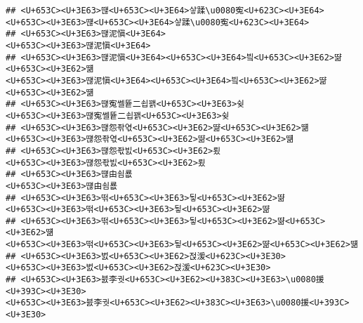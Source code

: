 \documentclass[]{article}
\begin{document}
\begin{verbatim}
## <U+653C><U+3E63>떊<U+653C><U+3E64>샇蹂\u0080寃<U+623C><U+3E64>                                                                                                                                     <U+653C><U+3E63>떊<U+653C><U+3E64>샇蹂\u0080寃<U+623C><U+3E64>
## <U+653C><U+3E63>떊泥愼<U+3E64>                                                                                                                                                                                   <U+653C><U+3E63>떊泥愼<U+3E64>
## <U+653C><U+3E63>떊泥愼<U+3E64><U+653C><U+3E64>빀<U+653C><U+3E62>땲<U+653C><U+3E62>떎                                                                                                           <U+653C><U+3E63>떊泥愼<U+3E64><U+653C><U+3E64>빀<U+653C><U+3E62>땲<U+653C><U+3E62>떎
## <U+653C><U+3E63>떊寃쎌뜥二쇱꽭<U+653C><U+3E63>슂                                                                                                                                                     <U+653C><U+3E63>떊寃쎌뜥二쇱꽭<U+653C><U+3E63>슂
## <U+653C><U+3E63>떊怨좎엯<U+653C><U+3E62>땲<U+653C><U+3E62>떎                                                                                                                                         <U+653C><U+3E63>떊怨좎엯<U+653C><U+3E62>땲<U+653C><U+3E62>떎
## <U+653C><U+3E63>떊怨좏빐<U+653C><U+3E62>룄                                                                                                                                                                 <U+653C><U+3E63>떊怨좏빐<U+653C><U+3E62>룄
## <U+653C><U+3E63>떊由쇰룞                                                                                                                                                                                         <U+653C><U+3E63>떊由쇰룞
## <U+653C><U+3E63>떢<U+653C><U+3E63>뒿<U+653C><U+3E62>땲                                                                                                                                                     <U+653C><U+3E63>떢<U+653C><U+3E63>뒿<U+653C><U+3E62>땲
## <U+653C><U+3E63>떢<U+653C><U+3E63>뒿<U+653C><U+3E62>땲<U+653C><U+3E62>떎                                                                                                                             <U+653C><U+3E63>떢<U+653C><U+3E63>뒿<U+653C><U+3E62>땲<U+653C><U+3E62>떎
## <U+653C><U+3E63>벐<U+653C><U+3E62>젅湲<U+623C><U+3E30>                                                                                                                                                     <U+653C><U+3E63>벐<U+653C><U+3E62>젅湲<U+623C><U+3E30>
## <U+653C><U+3E63>븘李궛<U+653C><U+3E62><U+383C><U+3E63>\u0080援<U+393C><U+3E30>                                                                                                                 <U+653C><U+3E63>븘李궛<U+653C><U+3E62><U+383C><U+3E63>\u0080援<U+393C><U+3E30>

\end{verbatim}
\end{document}
